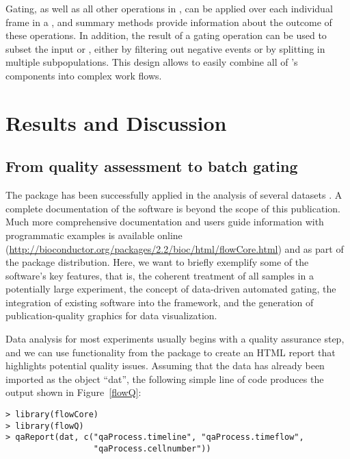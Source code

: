 \documentclass[10pt]{bmc_article}
\newenvironment{bmcformat}{\begin{raggedright}\baselineskip20pt\sloppy\setboolean{publ}{false}}{\end{raggedright}\baselineskip20pt\sloppy}
\begin{document}
\begin{bmcformat}
Gating, as well as all other operations in , can be
applied over each individual frame in a , and summary
methods provide information about the outcome of these operations. In
addition, the result of a gating operation can be used to subset the
input  or , either by filtering out
negative events or by splitting in multiple subpopulations. This
design allows to easily combine all of 's
components into complex work flows.

\section*{Results and Discussion}
  \subsection*{From quality assessment to batch gating}
  The  package has been successfully applied in the
  analysis of several datasets
  \citep{gasparetto2004ice,brinkman2007hcf}. A complete documentation
  of the  software is beyond the scope of this
  publication.  Much more comprehensive documentation and users guide
  information with programmatic examples is available online
  (\url{http://bioconductor.org/packages/2.2/bioc/html/flowCore.html})
  and as part of the package distribution. Here, we want to briefly
  exemplify some of the software's key features, that is, the coherent
  treatment of all samples in a potentially large experiment, the
  concept of data-driven automated gating, the integration of existing
  software into the framework, and the generation of
  publication-quality graphics for data visualization.

  Data analysis for most experiments usually begins with a quality
  assurance step, and we can use functionality from the
   package to create an HTML report that highlights
  potential quality issues. Assuming that the data has already been
  imported as the  object ``dat'', the following
  simple line of code produces the output shown in Figure~\ref{flowQ}:

\begin{verbatim}
> library(flowCore)
> library(flowQ)
> qaReport(dat, c("qaProcess.timeline", "qaProcess.timeflow", 
                  "qaProcess.cellnumber"))
\end{verbatim}


\end{bmcformat}
\end{document}
